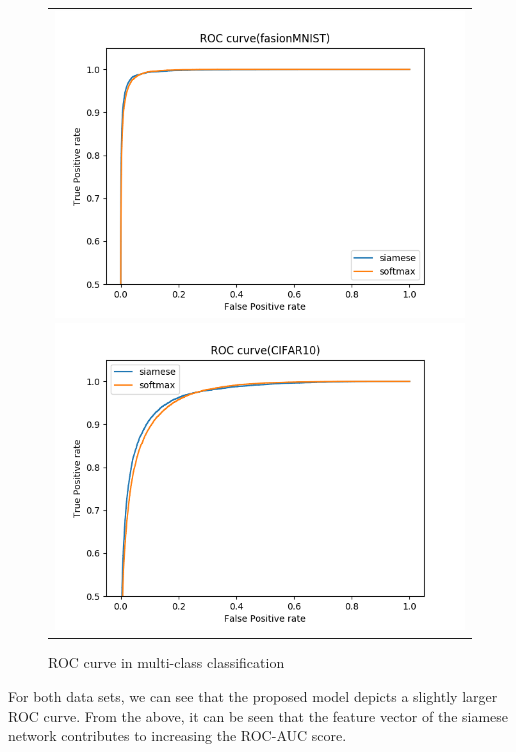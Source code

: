 \documentclass[twocolumn,10pt]{article}
\begin{document}
\begin{figure}[ht]
\centering
\begin{tabular}{c}
        \begin{minipage}{0.50\hsize}
            \centering
            \includegraphics[scale=0.25]{fasion_multiroccurve.png}
        \end{minipage}
          \begin{minipage}{0.50\hsize}
            \centering
            \includegraphics[scale=0.25]{multiroc_curve.png}
        \end{minipage}
\end{tabular}
\caption{ROC curve in multi-class classification}
\label{fig:roc-mul}
\end{figure}
For both data sets, we can see that the proposed model depicts a slightly larger ROC curve.
From the above, it can be seen that the feature vector of the siamese network contributes to increasing the ROC-AUC score.
\end{document}
